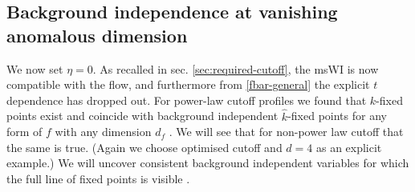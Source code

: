 \documentclass[11pt]{book} %
\newcommand{\hk}{\hat k}
\begin{document}
\subsection{Background independence at vanishing anomalous dimension}\label{sec:works}
We now set $\eta=0$. As recalled in sec. \ref{sec:required-cutoff}, the msWI is now compatible with the flow, and furthermore  from \eqref{fbar-general} the explicit $t$ dependence has dropped out.
For power-law cutoff profiles we found that $k$-fixed points exist and coincide with background independent $\hk$-fixed points for any form of $f$ with any dimension $d_f$ \cite{Dietz:2015owa}. We will see that for non-power law cutoff that the same is true. (Again we choose optimised cutoff and $d=4$ as an explicit example.) We will uncover consistent background independent variables for which the full line of fixed points is visible \cite{Dietz:2016gzg}.
\end{document}
